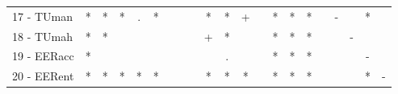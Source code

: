 \begin{table}[h]
\begin{center}
\begin{tabular}{lcc|cc|cc|cc|cc|cc|cc|cc|cc|cc}
17 - TUman	& * & * & * & . & * &   &   &   & * & * & + &   & * & * & * &   & - &   & * &   \\
18 - TUmah	& * & * &   &   &   &   &   &   & + & * &   &   & * & * & * &   &   & - &   &   \\ \hline
19 - EERacc	& * &   &   &   &   &   &   &   &   & . &   &   & * & * & * &   &   &   & - &   \\
20 - EERent	& * & * & * & * & * &   &   &   & * & * & * &   & * & * & * &   &   &   & * & - \\ \hline\end{tabular}
\label{stratsALCKappaFriedAllall}
\end{center}
\end{table}